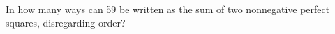 In how many ways can 59 be written as the sum of two nonnegative perfect squares, disregarding order?
